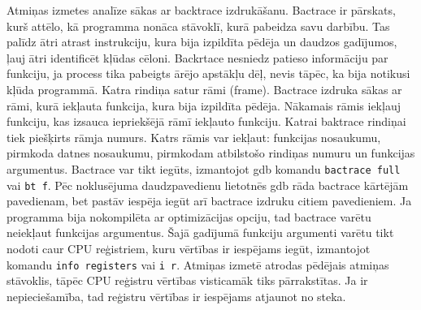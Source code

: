 Atmiņas izmetes analīze sākas ar backtrace izdrukāšanu. 
Bactrace ir pārskats, kurš attēlo, kā programma nonāca stāvoklī, kurā pabeidza savu darbību.
Tas palīdz ātri atrast instrukciju, kura bija izpildīta pēdēja un daudzos gadījumos, ļauj ātri identificēt kļūdas cēloni.
Backrtace nesniedz patieso informāciju par funkciju, ja process tika pabeigts ārējo apstākļu dēļ, nevis tāpēc, ka bija notikusi kļūda programmā.
Katra rindiņa satur rāmi (frame). Bactrace izdruka sākas ar rāmi, kurā iekļauta funkcija, kura bija izpildīta pēdēja. 
Nākamais rāmis iekļauj funkciju, kas izsauca iepriekšējā rāmī iekļauto funkciju.
Katrai baktrace rindiņai tiek piešķirts rāmja numurs. Katrs rāmis var iekļaut: funkcijas nosaukumu, pirmkoda datnes nosaukumu, pirmkodam atbilstošo rindiņas numuru un funkcijas argumentus. 
Bactrace var tikt iegūts, izmantojot gdb komandu \texttt{bactrace full} vai \texttt{bt f}. 
Pēc noklusējuma daudzpavedienu lietotnēs gdb  rāda bactrace kārtējām pavedienam, bet pastāv iespēja iegūt arī bactrace izdruku citiem pavedieniem.
Ja programma bija nokompilēta ar optimizācijas opciju, tad bactrace varētu neiekļaut funkcijas argumentus.
Šajā gadījumā funkciju argumenti varētu tikt nodoti caur CPU reģistriem, kuru vērtības ir iespējams iegūt, izmantojot komandu \texttt{info registers} vai \texttt{i r}.
Atmiņas izmetē atrodas pēdējais atmiņas stāvoklis, tāpēc CPU reģistru vērtības visticamāk tiks pārrakstītas.
 Ja ir nepieciešamība, tad reģistru vērtības ir iespējams atjaunot no steka.



